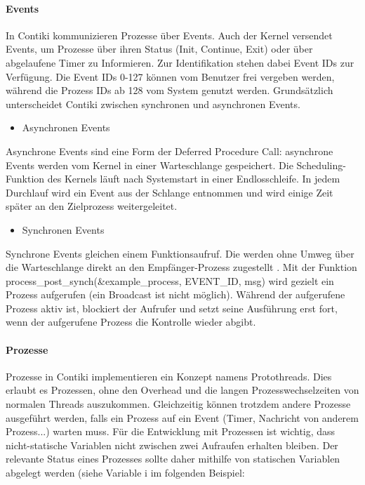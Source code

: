 \paragraph{Events}
In Contiki kommunizieren Prozesse \"uber Events. Auch der Kernel versendet Events, um Prozesse \"uber ihren Status 
(Init, Continue, Exit) oder \"uber abgelaufene Timer zu Informieren. Zur Identifikation stehen dabei Event IDs zur 
Verf\"ugung. Die Event IDs 0-127 k\"onnen vom Benutzer frei vergeben werden, w\"ahrend die Prozess IDs ab 128 vom 
System genutzt werden. Grunds\"atzlich unterscheidet Contiki zwischen synchronen und asynchronen Events. 
\begin{itemize}
\item Asynchronen Events
\end{itemize}
Asynchrone Events sind eine Form der Deferred Procedure Call: asynchrone Events werden vom Kernel in einer 
Warteschlange gespeichert. Die Scheduling-Funktion des Kernels l\"auft nach Systemstart in einer Endlosschleife. 
In jedem Durchlauf wird ein Event aus der Schlange entnommen und wird einige Zeit sp\"ater an den Zielprozess weitergeleitet.
\begin{itemize}
\item Synchronen Events
\end{itemize}
Synchrone Events gleichen einem Funktionsaufruf. Die werden ohne Umweg \"uber die Warteschlange direkt an den Empf\"anger-Prozess
zugestellt \cite[vgl.][S. 7]{Walter:2010}.  Mit der Funktion process\_post\_synch(\&example\_process, EVENT\_ID, msg) wird gezielt ein 
Prozess aufgerufen (ein Broadcast ist nicht m\"oglich). W\"ahrend der aufgerufene Prozess aktiv ist, blockiert der Aufrufer und 
setzt seine Ausführung erst fort, wenn der aufgerufene Prozess die Kontrolle wieder abgibt.

\paragraph{Prozesse}
Prozesse in Contiki implementieren ein Konzept namens Protothreads. Dies erlaubt es Prozessen, ohne den Overhead und die langen 
Prozesswechselzeiten von normalen Threads auszukommen. Gleichzeitig k\"onnen trotzdem andere Prozesse ausgef\"uhrt werden, falls
ein Prozess auf ein Event (Timer, Nachricht von anderem Prozess...) warten muss. F\"ur die Entwicklung mit Prozessen ist wichtig, 
dass nicht-statische Variablen nicht zwischen zwei Aufraufen erhalten bleiben. Der relevante Status eines Prozesses sollte daher 
mithilfe von statischen Variablen abgelegt werden (siehe Variable i im folgenden Beispiel:

